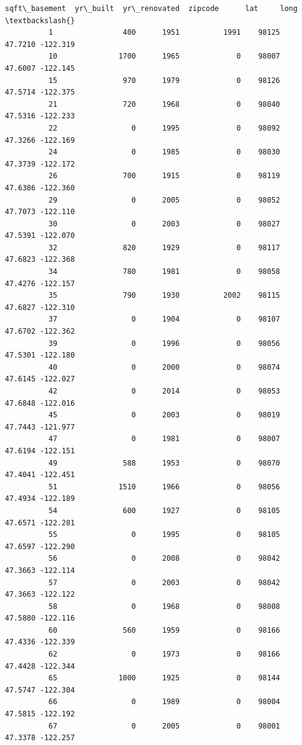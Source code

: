 \documentclass[11pt]{article}
\begin{document}
\begin{Verbatim}[commandchars=\\\{\}]
                 sqft\_basement  yr\_built  yr\_renovated  zipcode      lat     long  \textbackslash{}
          1                400      1951          1991    98125  47.7210 -122.319   
          10              1700      1965             0    98007  47.6007 -122.145   
          15               970      1979             0    98126  47.5714 -122.375   
          21               720      1968             0    98040  47.5316 -122.233   
          22                 0      1995             0    98092  47.3266 -122.169   
          24                 0      1985             0    98030  47.3739 -122.172   
          26               700      1915             0    98119  47.6386 -122.360   
          29                 0      2005             0    98052  47.7073 -122.110   
          30                 0      2003             0    98027  47.5391 -122.070   
          32               820      1929             0    98117  47.6823 -122.368   
          34               780      1981             0    98058  47.4276 -122.157   
          35               790      1930          2002    98115  47.6827 -122.310   
          37                 0      1904             0    98107  47.6702 -122.362   
          39                 0      1996             0    98056  47.5301 -122.180   
          40                 0      2000             0    98074  47.6145 -122.027   
          42                 0      2014             0    98053  47.6848 -122.016   
          45                 0      2003             0    98019  47.7443 -121.977   
          47                 0      1981             0    98007  47.6194 -122.151   
          49               588      1953             0    98070  47.4041 -122.451   
          51              1510      1966             0    98056  47.4934 -122.189   
          54               600      1927             0    98105  47.6571 -122.281   
          55                 0      1995             0    98105  47.6597 -122.290   
          56                 0      2008             0    98042  47.3663 -122.114   
          57                 0      2003             0    98042  47.3663 -122.122   
          58                 0      1968             0    98008  47.5880 -122.116   
          60               560      1959             0    98166  47.4336 -122.339   
          62                 0      1973             0    98166  47.4428 -122.344   
          65              1000      1925             0    98144  47.5747 -122.304   
          66                 0      1989             0    98004  47.5815 -122.192   
          67                 0      2005             0    98001  47.3378 -122.257   

\end{Verbatim}
\end{document}
